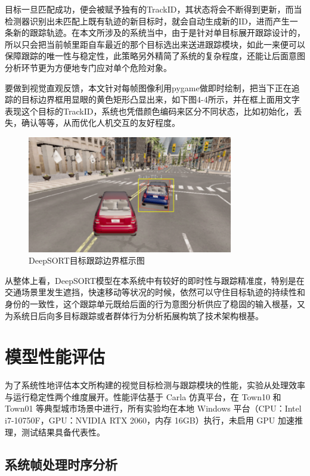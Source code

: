 目标一旦匹配成功，便会被赋予独有的TrackID，其状态将会不断得到更新，而当检测器识别出未匹配上既有轨迹的新目标时，就会自动生成新的ID，进而产生一条新的跟踪轨迹。在本文所涉及的系统当中，由于是针对单目标展开跟踪设计的，所以只会把当前帧里距自车最近的那个目标选出来送进跟踪模块，如此一来便可以保障跟踪的唯一性与稳定性，此策略另外精简了系统的复杂程度，还能让后面意图分析环节更为方便地专门应对单个危险对象。

要做到视觉直观反馈，本文针对每帧图像利用pygame做即时绘制，把当下正在追踪的目标边界框用显眼的黄色矩形凸显出来，如下图4-4所示，并在框上面用文字表现这个目标的TrackID，系统也凭借颜色编码来区分不同状态，比如初始化，丢失，确认等等，从而优化人机交互的友好程度。

\begin{figure}[H]
    \centering
    \includegraphics[width=0.8\textwidth]{images/图10 DeepSORT目标跟踪边界框示图.pdf}  %
    \caption{DeepSORT目标跟踪边界框示图}
    \label{fig:example_image}  %
\end{figure}

从整体上看，DeepSORT模型在本系统中有较好的即时性与跟踪精准度，特别是在交通场景里发生遮挡，快速移动等状况的时候，依然可以守住目标轨迹的持续性和身份的一致性，这个跟踪单元既给后面的行为意图分析供应了稳固的输入根基，又为系统日后向多目标跟踪或者群体行为分析拓展构筑了技术架构根基。

\section{模型性能评估}

为了系统性地评估本文所构建的视觉目标检测与跟踪模块的性能，实验从处理效率与运行稳定性两个维度展开。性能评估基于 Carla 仿真平台，在 Town10 和 Town01 等典型城市场景中进行，所有实验均在本地 Windows 平台（CPU：Intel i7-10750F，GPU：NVIDIA RTX 2060，内存 16GB）执行，未启用 GPU 加速推理，测试结果具备代表性。

\subsection{系统帧处理时序分析}

